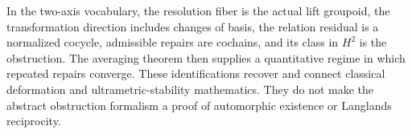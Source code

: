 In the two-axis vocabulary, the resolution fiber is the actual lift groupoid, the transformation direction includes changes of basis, the relation residual is a normalized cocycle, admissible repairs are cochains, and its class in $H^2$ is the obstruction. The averaging theorem then supplies a quantitative regime in which repeated repairs converge. These identifications recover and connect classical deformation and ultrametric-stability mathematics. They do not make the abstract obstruction formalism a proof of automorphic existence or Langlands reciprocity.
